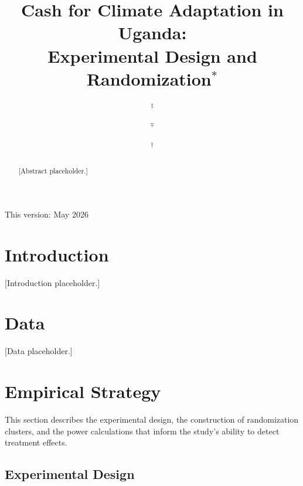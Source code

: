 \documentclass[12pt, oneside]{amsart}
\title[Cash for Climate Adaptation]{Cash for Climate Adaptation in Uganda: \\
Experimental Design and Randomization$^{*}$}
\author{ $^{\ddagger}$}
\author{ $^{\mp}$}
\author{ $^{\dagger}$}
\numberwithin{equation}{section}
\begin{document}
\maketitle
\begin{center}
This version: May 2026
\end{center}

\bigskip

\begin{abstract}
[Abstract placeholder.]
\end{abstract} 

\vfill
\thispagestyle{empty}
\newpage
\setcounter{page}{1}
\doublespacing

\section{\label{sec_intro}Introduction}

[Introduction placeholder.]

\section{\label{sec_data}Data}

[Data placeholder.]

\section{\label{sec_emp}Empirical Strategy}

This section describes the experimental design, the construction of randomization clusters, and the power calculations that inform the study's ability to detect treatment effects.

\subsection{\label{sec_design}Experimental Design}
\end{document}
